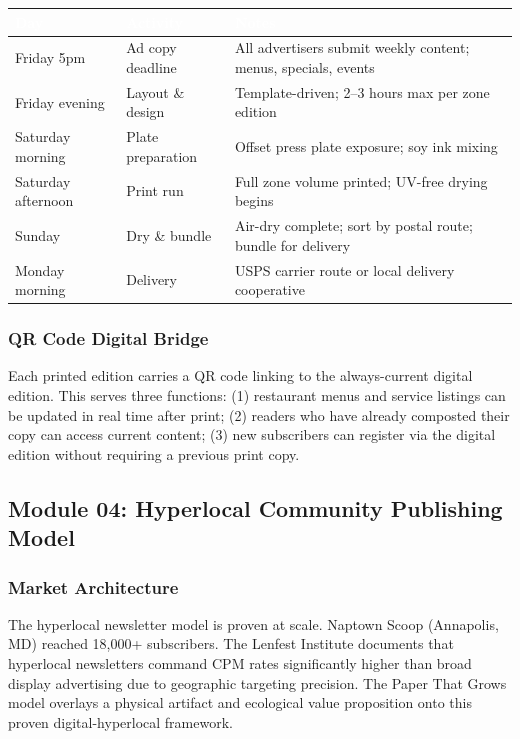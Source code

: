 \documentclass[11pt,letterpaper]{article}
\newcommand{\tableheader}[1]{\textbf{\sffamily\textcolor{white}{#1}}}
\begin{document}
\begin{center}
\begin{tabularx}{\textwidth}{L{2.5cm}L{3cm}X}
\toprule
{}
\tableheader{Day} & \tableheader{Activity} & \tableheader{Notes} \\
\midrule
Friday 5pm & Ad copy deadline & All advertisers submit weekly content; menus, specials, events \\
Friday evening & Layout \& design & Template-driven; 2--3 hours max per zone edition \\
Saturday morning & Plate preparation & Offset press plate exposure; soy ink mixing \\
Saturday afternoon & Print run & Full zone volume printed; UV-free drying begins \\
Sunday & Dry \& bundle & Air-dry complete; sort by postal route; bundle for delivery \\
Monday morning & Delivery & USPS carrier route or local delivery cooperative \\
\bottomrule
\end{tabularx}
\end{center}

\subsubsection{QR Code Digital Bridge}
Each printed edition carries a QR code linking to the always-current digital edition. This serves three functions: (1) restaurant menus and service listings can be updated in real time after print; (2) readers who have already composted their copy can access current content; (3) new subscribers can register via the digital edition without requiring a previous print copy.

\subsection{Module 04: Hyperlocal Community Publishing Model}

\subsubsection{Market Architecture}
The hyperlocal newsletter model is proven at scale. Naptown Scoop (Annapolis, MD) reached 18,000+ subscribers. The Lenfest Institute documents that hyperlocal newsletters command CPM rates significantly higher than broad display advertising due to geographic targeting precision. The Paper That Grows model overlays a physical artifact and ecological value proposition onto this proven digital-hyperlocal framework.
\end{document}
